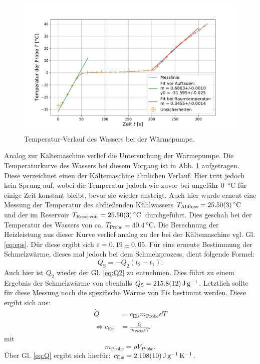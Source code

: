 	\begin{figure}[ht]
		\centering
		\includegraphics[width=\textwidth]{data/warm_machen.pdf}
		\caption{Temperatur-Verlauf des Wassers bei der Wärmepumpe.}
		\label{fig:Wärmepumpe}	
	\end{figure}
	Analog zur Kältemaschine verlief die Untersuchung der Wärmepumpe. 
	Die Temperaturkurve des Wassers bei diesem Vorgang ist in Abb. \ref{fig:Wärmepumpe} aufgetragen.
	Diese verzeichnet einen der Kältemaschine ähnlichen Verlauf.
	Hier tritt jedoch kein Sprung auf, wobei die Temperatur jedoch wie zuvor bei ungefähr \SI{0}{\celsius} für einige Zeit konstant bleibt, bevor sie wieder ansteigt.
	Auch hier wurde erneut eine Messung der Temperatur des abfließenden Kühlwassers $T_\text{Abfluss} = \SI{25,5+-0,03}{\celsius}$ und der im Reservoir $T_\text{Reservoir} = \SI{25,5+-0,03}{\celsius}$ durchgeführt.
	Dies geschah bei der Temperatur des Wassers von ca. $T_\text{Probe} = \SI{40,4}{\celsius}$.
	Die Berechnung der Heizleistung aus dieser Kurve verlief analog zu der bei der Kältemaschine vgl. Gl. \ref{eq:eps}.
	Dür diese ergibt sich $\varepsilon = 0,19\pm 0,05$.
	Für eine erneute Bestimmung der Schmelzwärme, dieses mal jedoch bei dem Schmelzprozess, dient folgende Formel:
	\begin{equation} %
		Q_\text{S} = -Q_2 (t_2 - t_1).
	\end{equation} %
	Auch hier ist $Q_2$ wieder der Gl. \ref{eq:Q2} zu entnehmen. 
	Dies führt zu einem Ergebnis der Schmelzwärme von ebenfalls $Q_\text{S} = \SI{215.8+-1.2}{\joule\per\gram}$.
	Letztlich sollte für diese Messung noch die spezifische Wärme von Eis bestimmt werden.
	Diese ergibt sich aus:
	\begin{align}
		\dot{Q} &= c_\text{Eis} m_\text{Probe} \dd T\\
		\Leftrightarrow c_\text{Eis} &= \frac{\dot{Q}}{m_\text{Probe}\dd T}
	\end{align} %
	mit
	\begin{equation}
		m_\text{Probe} = \rho V_{Probe}.
	\end{equation} %
	Über Gl. \ref{eq:Q} ergibt sich hierfür: $c_\text{Eis}=\SI{2.108+-0.010}{\joule\per\gram\per\kelvin}$.
	
